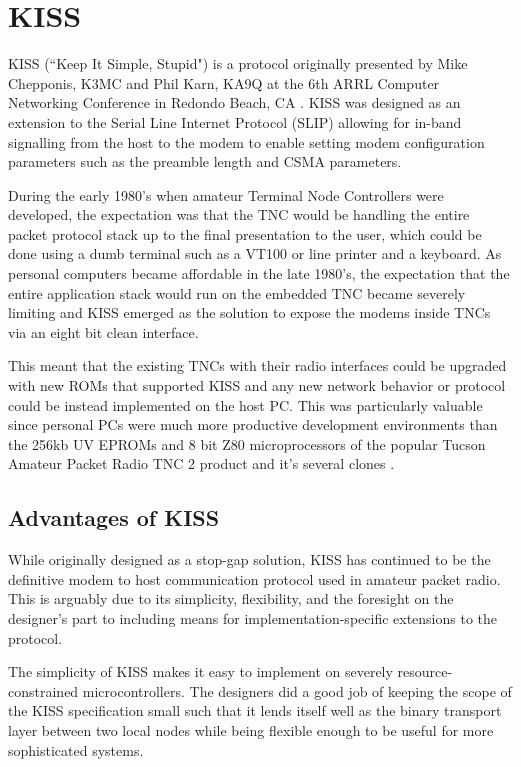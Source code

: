 \chapter{KISS}

KISS (``Keep It Simple, Stupid") is a protocol originally presented by 
Mike Chepponis, K3MC and Phil Karn, KA9Q at the 6th ARRL Computer Networking
Conference in Redondo Beach, CA \cite{KISSspec}.
KISS was designed as an extension to the Serial Line 
Internet Protocol (SLIP) allowing for in-band signalling from 
the host to the modem to enable setting modem 
configuration parameters such as the preamble length and CSMA parameters.

During the early 1980's when amateur Terminal Node Controllers were developed,
the expectation was that the TNC would be handling 
the entire packet protocol stack up to the final presentation to the user, which
could be done using a dumb terminal such as a VT100 or line printer 
and a keyboard. 
As personal computers became affordable in the late 1980's, the expectation that
the entire application stack would run on the embedded TNC became severely limiting
and KISS emerged as the solution to expose the modems inside TNCs via 
an eight bit clean interface.

This meant that the existing TNCs with their radio interfaces could
be upgraded with new ROMs that supported KISS and any new network behavior
or protocol could be instead implemented on the host PC.
This was particularly valuable since personal PCs were much
more productive development environments than the 256kb UV EPROMs and 8 bit
Z80 microprocessors of the popular Tucson Amateur Packet Radio TNC 2 product
and it's several clones \cite{TNC2manual}.

\section{Advantages of KISS}

While originally designed as a stop-gap solution, KISS has continued to be 
the definitive modem to host communication protocol used in amateur packet radio.
This is arguably due to its simplicity, flexibility,
and the foresight on the designer's part
to including means for implementation-specific extensions to the protocol.

The simplicity of KISS makes it easy to implement on severely resource-constrained
microcontrollers. The designers did a good job of keeping the scope of the KISS
specification small such that it lends itself well as the binary transport
layer between two local nodes while being flexible enough to be useful for
more sophisticated systems.

